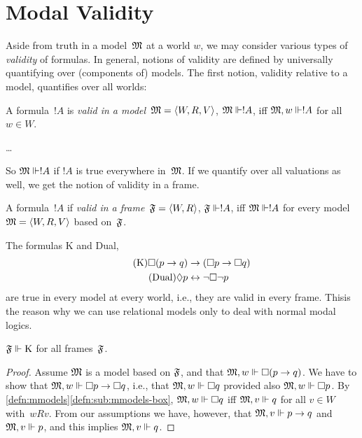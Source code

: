 \documentclass[modal-logic]{subfiles}
\begin{document}
\section{Modal Validity}

Aside from truth in a model~$\mathfrak M$ at a world $w$, we may consider various  types of \emph{validity} of formulas.  In general, notions of validity are defined by universally quantifying over (components of) models.  The first notion, validity relative to a model, quantifies over all worlds:

\begin{defn}\label{defn:valid-in-model}
A formula~$!A$ is \emph{valid in a model}~$\mathfrak M = \langle W, R, V\rangle$, $\mathfrak M \Vdash !A$, iff $\mathfrak M, w \Vdash !A$ for all $w \in W$.
\end{defn}

\begin{ex}
\dots
\end{ex}

So $\mathfrak M \Vdash !A$ if $!A$ is true everywhere in~$\mathfrak M$. If we quantify over all valuations as well, we get the notion of validity in a frame.

\begin{defn}\label{valid-in-frame}
A formula~$!A$ if \emph{valid in a frame}~$\mathfrak F = \langle W, R\rangle$,
$\mathfrak F \Vdash !A$, iff $\mathfrak M \Vdash !A$ for every model~$\mathfrak M = \langle W, R, V\rangle$ based on~$\mathfrak F$.
\end{defn}

The formulas K and Dual,
\begin{align}
\tag{K} \Box(p \to q) & \to (\Box p \to \Box q) \\
\tag{Dual} \Diamond p & \leftrightarrow \lnot\Box\lnot p
\end{align}
are true in every model at every world, i.e., they are valid in every frame.  Thisis the reason why we can use relational models only to deal with normal modal logics. 

\begin{prop}
$\mathfrak F \Vdash \mathrm{K}$ for all frames~$\mathfrak F$.
\end{prop}

\begin{proof}
Assume $\mathfrak M$ is a model based on $\mathfrak F$, and that $\mathfrak M, w \Vdash \Box(p \to q)$. We have to show that $\mathfrak M, w \Vdash \Box p \to \Box q$, i.e., that $\mathfrak M, w \Vdash \Box q$ provided also $\mathfrak M, w \Vdash \Box p$.  By \ref{defn:mmodels}\ref{defn:sub:mmodels-box}, $\mathfrak M, w \Vdash \Box q$ iff $\mathfrak M, v \Vdash q$ for all $v \in W$ with~$wRv$. From our assumptions we have, however, that $\mathfrak M, v \Vdash p \to q$ and $\mathfrak M, v \Vdash p$, and this implies $\mathfrak M, v \Vdash q$. 
\end{proof}
\end{document}

